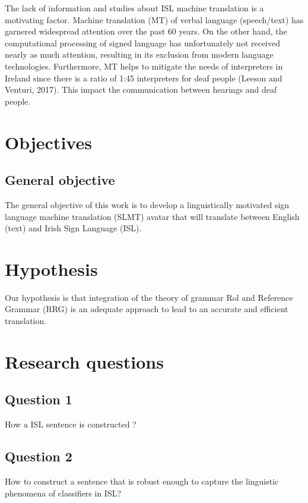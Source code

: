 The lack of information and studies about ISL machine translation is a motivating factor. Machine translation (MT) of verbal language (speech/text) has garnered widespread attention over the past 60 years. On the other hand, the computational processing of signed language has unfortunately not received nearly as much attention, resulting in its exclusion from modern language technologies. Furthermore, MT helps to mitigate the needs of interpreters in Ireland since there is a ratio of 1:45 interpreters for deaf people (Leeson and Venturi, 2017). This impact the communication between hearings and deaf people. 

\newpage




\section{Objectives}

\subsection{General objective}

The general objective of this work is to develop a linguistically motivated sign language machine translation (SLMT) avatar that will translate between English (text) and Irish Sign Language (ISL).



\newpage

\section{Hypothesis}

Our hypothesis is that integration of the theory of grammar Rol and Reference Grammar (RRG) is an adequate approach to lead to an accurate and efficient translation.  

\newpage


\section{Research questions}

\subsection{Question 1}
How a ISL sentence is constructed ?


\subsection{Question 2}
How to construct a sentence that is robust enough to capture the linguistic phenomena of classifiers in ISL?

